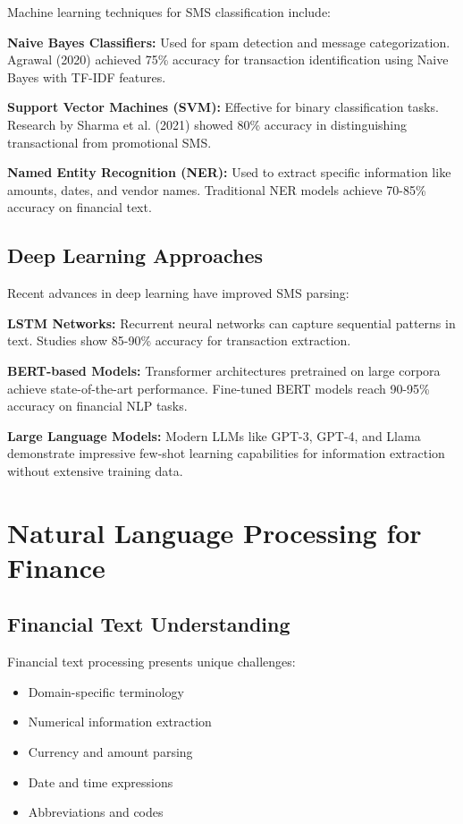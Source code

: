 \documentclass[11pt,a4paper]{report}
\begin{document}
Machine learning techniques for SMS classification include:

\textbf{Naive Bayes Classifiers:} Used for spam detection and message categorization. Agrawal (2020) achieved 75\% accuracy for transaction identification using Naive Bayes with TF-IDF features.

\textbf{Support Vector Machines (SVM):} Effective for binary classification tasks. Research by Sharma et al. (2021) showed 80\% accuracy in distinguishing transactional from promotional SMS.

\textbf{Named Entity Recognition (NER):} Used to extract specific information like amounts, dates, and vendor names. Traditional NER models achieve 70-85\% accuracy on financial text.

\subsection{Deep Learning Approaches}

Recent advances in deep learning have improved SMS parsing:

\textbf{LSTM Networks:} Recurrent neural networks can capture sequential patterns in text. Studies show 85-90\% accuracy for transaction extraction.

\textbf{BERT-based Models:} Transformer architectures pretrained on large corpora achieve state-of-the-art performance. Fine-tuned BERT models reach 90-95\% accuracy on financial NLP tasks.

\textbf{Large Language Models:} Modern LLMs like GPT-3, GPT-4, and Llama demonstrate impressive few-shot learning capabilities for information extraction without extensive training data.

\section{Natural Language Processing for Finance}

\subsection{Financial Text Understanding}

Financial text processing presents unique challenges:

\begin{itemize}
    \item Domain-specific terminology
    \item Numerical information extraction
    \item Currency and amount parsing
    \item Date and time expressions
    \item Abbreviations and codes
\end{itemize}
\end{document}
